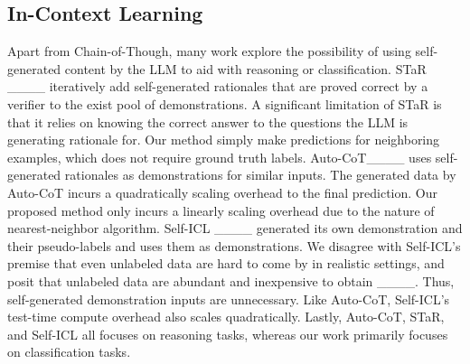 \subsection{In-Context Learning}
Apart from Chain-of-Though, many work explore the possibility of using self-generated content by the LLM to aid with reasoning or classification. STaR ____ iteratively add self-generated rationales that are proved correct by a verifier to the exist pool of demonstrations. A significant limitation of STaR is that it relies on knowing the correct answer to the questions the LLM is generating rationale for. Our method simply make predictions for neighboring examples, which does not require ground truth labels. Auto-CoT____ uses self-generated rationales as demonstrations for similar inputs. The generated data by Auto-CoT incurs a quadratically scaling overhead to the final prediction. Our proposed method only incurs a linearly scaling overhead due to the nature of nearest-neighbor algorithm. Self-ICL ____ generated its own demonstration and their pseudo-labels and uses them as demonstrations. We disagree with Self-ICL's premise that even unlabeled data are hard to come by in realistic settings, and posit that unlabeled data are abundant and inexpensive to obtain ____. Thus, self-generated demonstration inputs are unnecessary. Like Auto-CoT, Self-ICL's test-time compute overhead also scales quadratically. Lastly, Auto-CoT, STaR, and Self-ICL all focuses on reasoning tasks, whereas our work primarily focuses on classification tasks.





